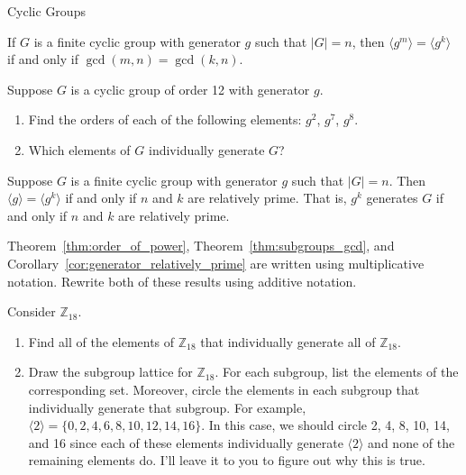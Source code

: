 \begin{section}{Cyclic Groups}
\begin{theorem}\label{thm:subgroups_gcd}
If $G$ is a finite cyclic group with generator $g$ such that $|G|=n$, then $\langle g^m\rangle=\langle g^k\rangle$ if and only if $\gcd(m,n)=\gcd(k,n)$.
\end{theorem}

\begin{problem}
Suppose $G$ is a cyclic group of order 12 with generator $g$. 
\begin{enumerate}[label=\textrm{(\alph*)}]
\item Find the orders of each of the following elements: $g^2$, $g^7$, $g^8$.
\item Which elements of $G$ individually generate $G$?
\end{enumerate}
\end{problem}

\begin{corollary}\label{cor:generator_relatively_prime}
Suppose $G$ is a finite cyclic group with generator $g$ such that $|G|=n$. Then $\langle g\rangle=\langle g^k\rangle$ if and only if $n$ and $k$ are relatively prime. That is, $g^k$ generates $G$ if and only if $n$ and $k$ are relatively prime.
\end{corollary}

\begin{problem}
Theorem~\ref{thm:order_of_power}, Theorem~\ref{thm:subgroups_gcd}, and Corollary~\ref{cor:generator_relatively_prime} are written using multiplicative notation.  Rewrite both of these results using additive notation.
\end{problem}

\begin{problem}
Consider $\mathbb{Z}_{18}$.
\begin{enumerate}[label=\textrm{(\alph*)}]
\item Find all of the elements of $\mathbb{Z}_{18}$ that individually generate all of $\mathbb{Z}_{18}$.
\item Draw the subgroup lattice for $\mathbb{Z}_{18}$. For each subgroup, list the elements of the corresponding set.  Moreover, circle the elements in each subgroup that individually generate that subgroup.  For example, $\langle 2\rangle=\{0,2,4,6,8,10,12,14,16\}$. In this case, we should circle 2, 4, 8, 10, 14, and 16 since each of these elements individually generate $\langle 2\rangle$ and none of the remaining elements do.  I'll leave it to you to figure out why this is true.
\end{enumerate}
\end{problem}


\end{section}
